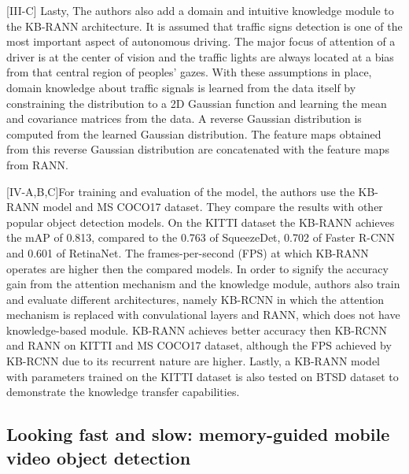 \documentclass[conference]{IEEEtran}
\begin{document}
[III-C] Lasty, The authors also add a domain and intuitive knowledge module to the KB-RANN architecture. It is assumed that traffic signs detection is one of the most important aspect of autonomous driving. The major focus of attention of a driver is at the center of vision and the traffic lights are always located at a bias from that central region of peoples' gazes. With these assumptions in place, domain knowledge about traffic signals is learned from the data itself by constraining the distribution to a 2D Gaussian function and learning the mean and covariance matrices from the data. A reverse Gaussian distribution is computed from the learned Gaussian distribution. The feature maps obtained from this reverse Gaussian distribution are concatenated with the feature maps from RANN. \newline

[IV-A,B,C]For training and evaluation of the model, the authors use the KB-RANN model and MS COCO17 dataset. They compare the results with other popular object detection models. On the KITTI dataset the KB-RANN achieves the mAP of 0.813, compared to the 0.763 of SqueezeDet, 0.702 of Faster R-CNN and 0.601 of RetinaNet. The frames-per-second (FPS) at which KB-RANN operates are higher then the compared models. In order to signify the accuracy gain from the attention mechanism and the knowledge module, authors also train and evaluate different architectures, namely KB-RCNN in which the attention mechanism is replaced with convulational layers and RANN, which does not have knowledge-based module. KB-RANN achieves better accuracy then KB-RCNN and RANN on KITTI and MS COCO17 dataset, although the FPS achieved by KB-RCNN due to its recurrent nature are higher. Lastly, a KB-RANN model with parameters trained on the KITTI dataset is also tested on BTSD dataset to demonstrate the knowledge transfer capabilities.

\subsection{Looking fast and slow: memory-guided mobile video object detection \cite{b7}}
\end{document}
